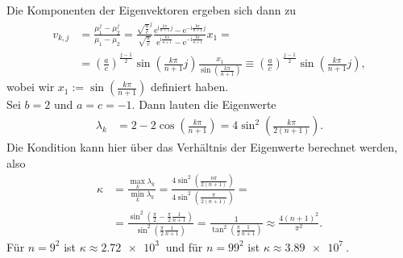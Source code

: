 \documentclass[english, parskip=full]{scrartcl}
\newcommand{\kla}{}
\renewcommand{\i}{\text{i}}
\newcommand{\e}{\text{e}}
\begin{document}
Die Komponenten der Eigenvektoren ergeben sich dann zu
\begin{align}
v_{k,j} &= \frac{\mu_1^j - \mu_2^j}{\mu_1 - \mu_2} = \frac{\sqrt{\frac{a}{c}}^j}{\sqrt{\frac{a}{c}}} \frac{\e^{\i \frac{k\pi}{n+1} j} - \e^{-\i \frac{k\pi}{n+1} j}}{\e^{\i \frac{k\pi}{n+1} } - \e^{-\i \frac{k\pi}{n+1} }} x_1 = \\
&= \kla\left( \frac{a}{c} \right)^{\frac{j-1}{2}} \sin\kla\left( \frac{k\pi }{n+1}j \right) \frac{x_1}{\sin\kla\left( \frac{k\pi}{n+1} \right)} \equiv \kla\left( \frac{a}{c} \right)^{\frac{j-1}{2}} \sin\kla\left( \frac{k\pi}{n+1}j \right),
\end{align}
wobei wir $x_1 := \sin\kla\left( \frac{k\pi}{n+1} \right)$ definiert haben.
\\
Sei $b=2$ und $a=c=-1$.
Dann lauten die Eigenwerte
\begin{align}
\lambda_k &= 2 - 2\cos\kla\left( \frac{k\pi}{n+1} \right) = 4\sin^2\kla\left( \frac{k\pi}{2(n+1)} \right).
\end{align}
Die Kondition kann hier über das Verhältnis der Eigenwerte berechnet werden, also
\begin{align}
\kappa &= \frac{\max_k \lambda_k}{\min_k \lambda_k} = \frac{4\sin^2\kla\left( \frac{n\pi}{2(n+1)} \right)}{4\sin^2\kla\left( \frac{\pi}{2(n+1)} \right)} = \\
&= \frac{\sin^2\kla\left( \frac{\pi}{2} - \frac{\pi}{2} \frac{1}{n+1} \right)}{\sin^2\kla\left( \frac{\pi}{2} \frac{1}{n+1} \right)} = \frac{1}{\tan^2\kla\left( \frac{\pi}{2} \frac{1}{n+1} \right)} \approx \frac{4(n+1)^2}{\pi^2}.
\end{align}
Für $n=9^2$ ist $\kappa \approx \SI{2.72e3}{}$ und für $n=99^2$ ist $\kappa \approx \SI{3.89e7}{}$.
\end{document}
